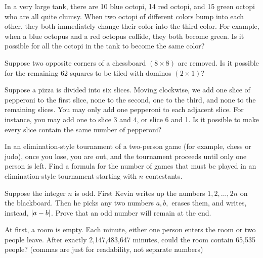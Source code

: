 \documentclass[12pt]{article}
\begin{document}
        \begin{exercise}
            In a very large tank, there are 10 blue octopi, 14 red octopi, and 15 green octopi who are all quite clumsy.
            When two octopi of different colors bump into each other, they both immediately change their color into the third color.
            For example, when a blue octopus and a red octopus collide, they both become green.
            Is it possible for all the octopi in the tank to become the same color?
        \end{exercise}

        \begin{exercise}
            Suppose two opposite corners of a chessboard \((8\times 8)\) are removed. Is it possible for the remaining 62 squares to be tiled with dominos \((2\times 1)\)?
        \end{exercise}

        \begin{exercise}
            Suppose a pizza is divided into six slices. Moving clockwise, we add one slice of pepperoni to the first slice, none to the second, one to the third, and none to the remaining slices. You may only add one pepperoni to each adjacent slice. For instance, you may add one to slice 3 and 4, or slice 6 and 1. Is it possible to make every slice contain the same number of pepperoni?
        \end{exercise}
    
        \begin{exercise}
            In an elimination-style tournament of a two-person game (for example, chess or judo), once you lose, you are out, and the tournament proceeds until only one person is left. Find a formula for the number of games that must be played in an elimination-style tournament starting with \(n\) contestants.
        \end{exercise}
    
        \begin{exercise}
            Suppose the integer \(n\) is odd. First Kevin writes up the numbers \(1, 2, \ldots, 2n\) on the blackboard. Then he picks any two numbers \(a, b,\) erases them, and writes, instead, \(\left\lvert a-b \right\rvert\). Prove that an odd number will remain at the end.
        \end{exercise}
    
        \begin{exercise}
            At first, a room is empty. Each minute, either one person enters the room or two people leave. After exactly 2,147,483,647 minutes, could the room contain 65,535 people? (commas are just for readability, not separate numbers)
        \end{exercise}
    
\end{document}
